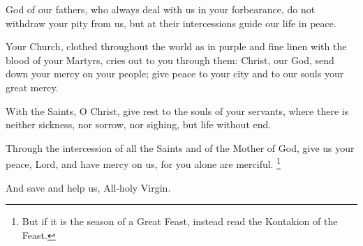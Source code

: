 

\creed


\itistrulyright

\greaterinhonour


\trisagion


God of our fathers, who always deal with us in your forbearance, do not withdraw your pity from us, but at their intercessions guide our life in peace.

Your Church, clothed throughout the world as in purple and fine linen with the blood of your Martyrs, cries out to you through them: Christ, our God, send down your mercy on your people; give peace to your city and to our souls your great mercy.


With the Saints, O Christ, give rest to the souls of your servants, where there is neither sickness, nor sorrow, nor sighing, but life without end.


Through the intercession of all the Saints and of the Mother of God, give us your peace, Lord, and have mercy on us, for you alone are merciful.
\footnote{But if it is the season of a Great Feast, instead read the Kontakion of the Feast.}



\hours


\glorybothnow

\greaterinhonour

\throughtheprayers


And save and help us, All-holy Virgin.


